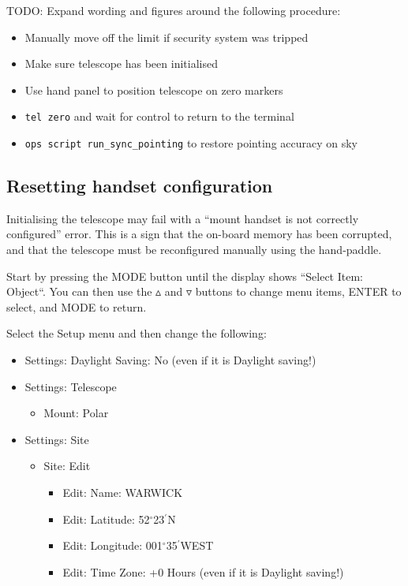 \documentclass[12pt,a4paper]{article}
\begin{document}
TODO: Expand wording and figures around the following procedure:
\begin{itemize}
    \item Manually move off the limit if security system was tripped
    \item Make sure telescope has been initialised
    \item Use hand panel to position telescope on zero markers
    \item \texttt{tel zero} and wait for control to return to the terminal
    \item \texttt{ops script run\_sync\_pointing} to restore pointing accuracy on sky
\end{itemize}

\subsection{Resetting handset configuration}

Initialising the telescope may fail with a ``mount handset is not correctly configured'' error. This is a sign that the on-board memory has been corrupted, and that the telescope must be reconfigured manually using the hand-paddle.

Start by pressing the MODE button until the display shows ``Select Item: Object``. You can then use the $\vartriangle$ and $\triangledown$ buttons to change menu items, ENTER to select, and MODE to return.

Select the Setup menu and then change the following:

\begin{itemize}
   \item Settings: Daylight Saving: No (even if it is Daylight saving!)
   \item Settings: Telescope\begin{itemize}
        \item Mount: Polar
    \end{itemize}
    \item Settings: Site\begin{itemize}
        \item Site: Edit \begin{itemize}
            \item Edit: Name: WARWICK
            \item Edit: Latitude: 52$^\circ$23$^\prime$N
            \item Edit: Longitude: 001$^\circ$35$^\prime$WEST
            \item Edit: Time Zone: +0 Hours (even if it is Daylight saving!)
        \end{itemize}
    \end{itemize}
\end{itemize}
\end{document}
